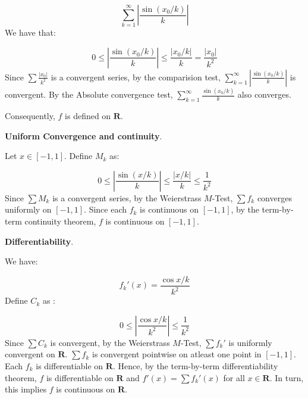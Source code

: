 \documentclass[10pt]{article}
\begin{document}
\begin{equation*}
\sum _{k=1}^{\infty }\left| \frac{\sin( x_{0} /k)}{k}\right| 
\end{equation*}
We have that:


\begin{equation*}
0\leq \left| \frac{\sin( x_{0} /k)}{k}\right| \leq \frac{|x_{0} /k|}{k} =\frac{|x_{0} |}{k^{2}}
\end{equation*}
Since $\displaystyle \sum \frac{|x_{0} |}{k^{2}}$ is a convergent series, by the comparision test, $\displaystyle \sum _{k=1}^{\infty }\left| \frac{\sin( x_{0} /k)}{k}\right| $ is convergent. By the Absolute convergence test, $\displaystyle \sum _{k=1}^{\infty }\frac{\sin( x_{0} /k)}{k}$ also converges. 



Consequently, $\displaystyle f$ is defined on $\displaystyle \mathbf{R}$. 



\textbf{Uniform Convergence and continuity}.



Let $\displaystyle x\in [ -1,1]$. Define $\displaystyle M_{k}$ as:


\begin{equation*}
0\leq \left| \frac{\sin( x /k)}{k}\right| \leq \frac{|x/k|}{k} \leq \frac{1}{k^{2}}
\end{equation*}
Since $\displaystyle \sum M_{k}$ is a convergent series, by the Weierstrass $\displaystyle M$-Test, $\displaystyle \sum f_{k}$ converges uniformly on $\displaystyle [ -1,1]$. Since each $\displaystyle f_{k}$ is continuous on $\displaystyle [ -1,1]$, by the term-by-term continuity theorem, $\displaystyle f$ is continuous on $\displaystyle [ -1,1]$.



\textbf{Differentiability}.



We have:


\begin{equation*}
f_{k} '( x) =\frac{\cos x/k}{k^{2}}
\end{equation*}
Define $\displaystyle C_{k}$ as :


\begin{equation*}
0\leq \left| \frac{\cos x/k}{k^{2}}\right| \leq \frac{1}{k^{2}}
\end{equation*}
Since $\displaystyle \sum C_{k}$ is convergent, by the Weierstrass $\displaystyle M$-Test, $\displaystyle \sum f_{k} '$ is uniformly convergent on $\displaystyle \mathbf{R}$. $\displaystyle \sum f_{k}$ is convergent pointwise on atleast one point in $\displaystyle [ -1,1]$. Each $\displaystyle f_{k}$ is differentiable on $\displaystyle \mathbf{R}$. Hence, by the term-by-term differentiability theorem, $\displaystyle f$ is differentiable on $\displaystyle \mathbf{R}$ and $\displaystyle f'( x) =\sum f_{k} '( x)$ for all $\displaystyle x\in \mathbf{R}$. In turn, this implies $\displaystyle f$ is continuous on $\displaystyle \mathbf{R}$. \ 
\end{document}
